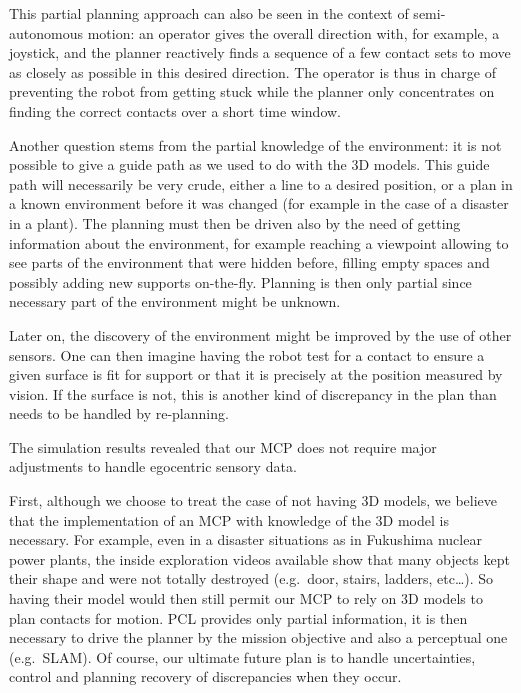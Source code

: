 This partial planning approach can also be seen in the context of semi-autonomous motion: an operator gives the overall direction with, for example, a joystick, and the planner reactively finds a sequence of a few contact sets to move as closely as possible in this desired direction.
The operator is thus in charge of preventing the robot from getting stuck while the planner only concentrates on finding the correct contacts over a short time window.

Another question stems from the partial knowledge of the environment: it is not possible to give a guide path as we used to do with the 3D models.
This guide path will necessarily be very crude, either a line to a desired position, or a plan in a known environment before it was changed (for example in the case of a disaster in a plant).
The planning must then be driven also by the need of getting information about the environment, for example reaching a viewpoint allowing to see parts of the environment that were hidden before, filling empty spaces and possibly adding new supports on-the-fly.
Planning is then only partial since necessary part of the environment might be unknown.

Later on, the discovery of the environment might be improved by the use of other sensors.
One can then imagine having the robot test for a contact to ensure a given surface is fit for support or that it is precisely at the position measured by vision.
If the surface is not, this is another kind of discrepancy in the plan than needs to be handled by re-planning.


The simulation results revealed that our MCP does not require major adjustments to handle egocentric sensory data.

First, although we choose to treat the case of not having 3D models, we believe that the implementation of an MCP with knowledge of the 3D model is necessary.
For example, even in a disaster situations as in Fukushima nuclear power plants, the inside exploration videos available show that many objects kept their shape and were not totally destroyed (e.g.\ door, stairs, ladders, etc\ldots).
So having their model would then still permit our MCP to rely on 3D models to plan contacts for motion.
PCL provides only partial information, it is then necessary to drive the planner by the mission objective and also a perceptual one (e.g.\ SLAM).
Of course, our ultimate future plan is to handle uncertainties, control and planning recovery of discrepancies when they occur.


